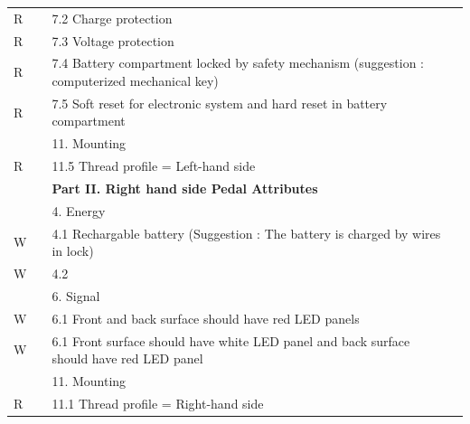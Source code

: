 \documentclass{article}
\begin{document}
\begin{longtable}{|C{1cm}|C{2cm}|L{9.56cm}|L{4cm}|}
		R & & \hspace{1mm} 7.2 Charge protection & \\
		R & & \hspace{1mm} 7.3 Voltage protection  & \\
		R & & \hspace{1mm} 7.4 Battery compartment locked by safety mechanism (suggestion : computerized mechanical key) & \\
		R & & \hspace{1mm} 7.5 Soft reset for electronic system and hard reset in battery compartment & \\
		\hline
		& & 11. Mounting & \\
		R & & \hspace{1mm} 11.5 Thread profile = Left-hand side & \\
		\hline
		& & \textbf{Part II. Right hand side Pedal Attributes} & \\
		\hline
		& & 4. Energy & \\
		W & & \hspace{1mm} 4.1 Rechargable battery (Suggestion : The battery is charged by wires in lock) &  \\
		W & & \hspace{1mm} 4.2  &  \\
		\hline
		& & 6. Signal & \\
		W & & \hspace{1mm} 6.1 Front and back surface should have red LED panels  &  \\
		W & & \hspace{1mm} 6.1 Front  surface should have white LED panel and back surface should have red LED panel  &  \\
		\hline
		
		\hline
		& & 11. Mounting & \\
		R & & \hspace{1mm} 11.1 Thread profile = Right-hand side   & \\
		\hline	  
		
	\end{longtable} 
	
	
	
	
	
	
	
	
	
\end{document}
